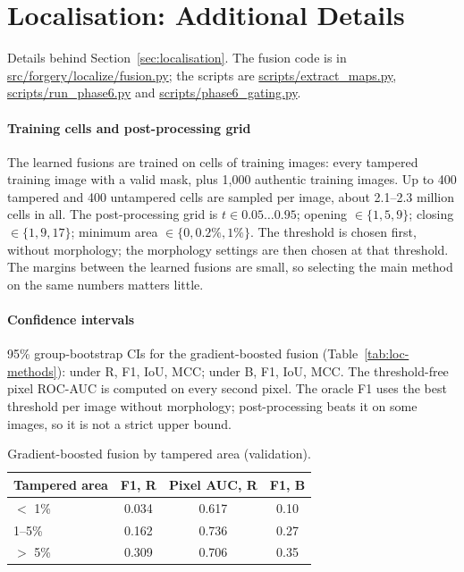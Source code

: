 \section{Localisation: Additional Details}\label{app:localisation}
\begingroup\sloppy{}
Details behind Section~\ref{sec:localisation}. The fusion code is in \url{src/forgery/localize/fusion.py}; the scripts are \url{scripts/extract_maps.py}, \url{scripts/run_phase6.py} and \url{scripts/phase6_gating.py}.

\paragraph{Training cells and post-processing grid} The learned fusions are trained on cells of training images: every tampered training image with a valid mask, plus 1,000 authentic training images. Up to 400 tampered and 400 untampered cells are sampled per image, about 2.1--2.3 million cells in all. The post-processing grid is $t \in 0.05\ldots0.95$; opening $\in \{1, 5, 9\}$; closing $\in \{1, 9, 17\}$; minimum area $\in \{0, 0.2\%, 1\%\}$. The threshold is chosen first, without morphology; the morphology settings are then chosen at that threshold. The margins between the learned fusions are small, so selecting the main method on the same numbers matters little.

\paragraph{Confidence intervals} 95\% group-bootstrap CIs for the gradient-boosted fusion (Table~\ref{tab:loc-methods}): under R, F1, IoU, MCC; under B, F1, IoU, MCC. The threshold-free pixel ROC-AUC is computed on every second pixel. The oracle F1 uses the best threshold per image without morphology; post-processing beats it on some images, so it is not a strict upper bound.

\begin{table}[!ht]
\centering
\caption{Gradient-boosted fusion by tampered area (validation).}
\label{tab:app-loc-area}
\footnotesize
\begin{tabular}{lccc}
\toprule
Tampered area & F1, R & Pixel AUC, R & F1, B \\
\midrule
$<$ 1\% & 0.034 & 0.617 & 0.10 \\
1--5\% & 0.162 & 0.736 & 0.27 \\
$>$ 5\% & 0.309 & 0.706 & 0.35 \\
\bottomrule
\end{tabular}
\end{table}

